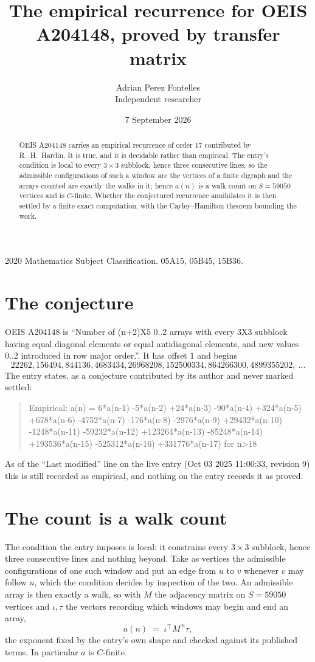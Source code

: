 \documentclass[11pt,a4paper]{article}
\title{The empirical recurrence for OEIS A204148, proved by transfer matrix}
\author{Adrian Perez Fontelles\\ \small Independent researcher}
\date{7 September 2026}
\theoremstyle{plain}
\theoremstyle{definition}
\begin{document}
\maketitle

\begin{abstract}
OEIS A204148 carries an empirical recurrence of order $17$ contributed by R.~H.~Hardin. It is
true, and it is decidable rather than empirical. The entry's condition is local to every $3\times3$ subblock, hence three consecutive lines, so
the admissible configurations of such a window are the vertices of a finite digraph and the
arrays counted are exactly the walks in it; hence $a(n)$ is a walk count on $S=59050$ vertices
and is $C$-finite. Whether the conjectured recurrence annihilates it is then settled by a
finite exact computation, with the Cayley--Hamilton theorem bounding the work.
\end{abstract}

\noindent\small 2020 Mathematics Subject Classification. 05A15, 05B45, 15B36.\normalsize

\section{The conjecture}

OEIS A204148 is ``Number of (n+2)X5 0..2 arrays with every 3X3 subblock having equal diagonal elements or equal antidiagonal elements, and new values 0..2 introduced in row major order.''. It has offset $1$ and begins
\[
22262, 156494, 844136, 4683434, 26968208, 152500334, 864266300, 4899355202,\ \dots
\]
The entry states, as a conjecture contributed by its author and never marked settled:
\begin{quote}
Empirical: a(n) = 6*a(n-1) -5*a(n-2) +24*a(n-3) -90*a(n-4) +324*a(n-5) +678*a(n-6) -4752*a(n-7) -176*a(n-8) -2976*a(n-9) +29432*a(n-10) -1248*a(n-11) -59232*a(n-12) +123264*a(n-13) -85248*a(n-14) +193536*a(n-15) -525312*a(n-16) +331776*a(n-17) for n>18
\end{quote}
As of the ``Last modified'' line on the live entry (Oct 03 2025 11:00:33, revision 9) this is still
recorded as empirical, and nothing on the entry records it as proved.

\section{The count is a walk count}

The condition the entry imposes is local: it constrains every $3\times3$ subblock, hence three consecutive lines and nothing beyond. Take as
vertices the admissible configurations of one such window and put an edge from $u$ to $v$
whenever $v$ may follow $u$, which the condition decides by inspection of the two. An
admissible array is then exactly a walk, so with $M$ the adjacency matrix on $S=59050$ vertices
and $\iota,\tau$ the vectors recording which windows may begin and end an array,
\[
a(n)\;=\;\iota^{\!\top}M^{\,n}\tau ,
\]
the exponent fixed by the entry's own shape and checked against its published terms. In
particular $a$ is $C$-finite.
\end{document}

